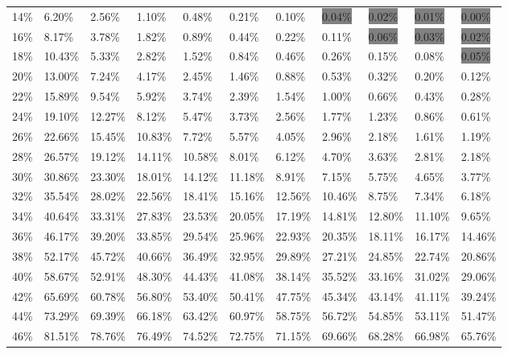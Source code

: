 \documentclass[letterpaper,12pt]{report}
\begin{document}
\begin{table}
{\begin{tabular}{l|llllllllll}
    14\% & 6.20\%  & 2.56\%  & 1.10\%  & 0.48\%  & 0.21\%  & 0.10\%  & \colorbox{gray}{0.04\%}  & \colorbox{gray}{0.02\%}  & \colorbox{gray}{0.01\%}  & \colorbox{gray}{0.00\%}  \\
    16\% & 8.17\%  & 3.78\%  & 1.82\%  & 0.89\%  & 0.44\%  & 0.22\%  & 0.11\%  & \colorbox{gray}{0.06\%}  & \colorbox{gray}{0.03\%}  & \colorbox{gray}{0.02\%}  \\
    18\% & 10.43\% & 5.33\%  & 2.82\%  & 1.52\%  & 0.84\%  & 0.46\%  & 0.26\%  & 0.15\%  & 0.08\%  & \colorbox{gray}{0.05\%}  \\
    20\% & 13.00\% & 7.24\%  & 4.17\%  & 2.45\%  & 1.46\%  & 0.88\%  & 0.53\%  & 0.32\%  & 0.20\%  & 0.12\%  \\
    22\% & 15.89\% & 9.54\%  & 5.92\%  & 3.74\%  & 2.39\%  & 1.54\%  & 1.00\%  & 0.66\%  & 0.43\%  & 0.28\%  \\
    24\% & 19.10\% & 12.27\% & 8.12\%  & 5.47\%  & 3.73\%  & 2.56\%  & 1.77\%  & 1.23\%  & 0.86\%  & 0.61\%  \\
    26\% & 22.66\% & 15.45\% & 10.83\% & 7.72\%  & 5.57\%  & 4.05\%  & 2.96\%  & 2.18\%  & 1.61\%  & 1.19\%  \\
    28\% & 26.57\% & 19.12\% & 14.11\% & 10.58\% & 8.01\%  & 6.12\%  & 4.70\%  & 3.63\%  & 2.81\%  & 2.18\%  \\
    30\% & 30.86\% & 23.30\% & 18.01\% & 14.12\% & 11.18\% & 8.91\%  & 7.15\%  & 5.75\%  & 4.65\%  & 3.77\%  \\
    32\% & 35.54\% & 28.02\% & 22.56\% & 18.41\% & 15.16\% & 12.56\% & 10.46\% & 8.75\%  & 7.34\%  & 6.18\%  \\
    34\% & 40.64\% & 33.31\% & 27.83\% & 23.53\% & 20.05\% & 17.19\% & 14.81\% & 12.80\% & 11.10\% & 9.65\%  \\
    36\% & 46.17\% & 39.20\% & 33.85\% & 29.54\% & 25.96\% & 22.93\% & 20.35\% & 18.11\% & 16.17\% & 14.46\% \\
    38\% & 52.17\% & 45.72\% & 40.66\% & 36.49\% & 32.95\% & 29.89\% & 27.21\% & 24.85\% & 22.74\% & 20.86\% \\
    40\% & 58.67\% & 52.91\% & 48.30\% & 44.43\% & 41.08\% & 38.14\% & 35.52\% & 33.16\% & 31.02\% & 29.06\% \\
    42\% & 65.69\% & 60.78\% & 56.80\% & 53.40\% & 50.41\% & 47.75\% & 45.34\% & 43.14\% & 41.11\% & 39.24\% \\
    44\% & 73.29\% & 69.39\% & 66.18\% & 63.42\% & 60.97\% & 58.75\% & 56.72\% & 54.85\% & 53.11\% & 51.47\% \\
    46\% & 81.51\% & 78.76\% & 76.49\% & 74.52\% & 72.75\% & 71.15\% & 69.66\% & 68.28\% & 66.98\% & 65.76\% \\

\end{tabular}}
\end{table}
\end{document}
